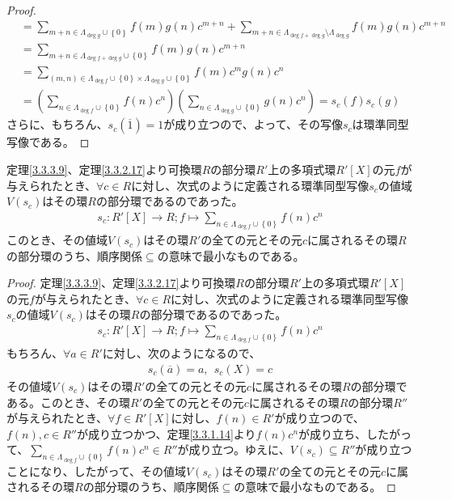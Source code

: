 \documentclass[dvipdfmx]{jsarticle}
\begin{document}
\begin{proof}
\begin{align*}
&= \sum_{m + n \in \varLambda_{\deg g} \cup \left\{ 0 \right\}} {f(m)g(n)c^{m + n}} + \sum_{m + n \in \varLambda_{\deg f + \deg g} \setminus \varLambda_{\deg g}} {f(m)g(n)c^{m + n}}\\
&= \sum_{m + n \in \varLambda_{\deg f + \deg g} \cup \left\{ 0 \right\}} {f(m)g(n)c^{m + n}}\\
&= \sum_{(m,n) \in \varLambda_{\deg f} \cup \left\{ 0 \right\} \times \varLambda_{\deg g} \cup \left\{ 0 \right\}} {f(m)c^{m}g(n)c^{n}}\\
&= \left( \sum_{n \in \varLambda_{\deg f} \cup \left\{ 0 \right\}} {f(n)c^{n}} \right)\left( \sum_{n \in \varLambda_{\deg g} \cup \left\{ 0 \right\}} {g(n)c^{n}} \right) = s_{c}(f)s_{c}(g)
\end{align*}
さらに、もちろん、$s_{c}\left( \overline{1} \right) = 1$が成り立つので、よって、その写像$s_{c}$は環準同型写像である。
\end{proof}
\begin{thm}\label{3.3.3.10}
定理\ref{3.3.3.9}、定理\ref{3.3.2.17}より可換環$R$の部分環$R'$上の多項式環$R'[ X]$の元$f$が与えられたとき、$\forall c \in R$に対し、次式のように定義される環準同型写像$s_{c}$の値域$V\left( s_{c} \right)$はその環$R$の部分環であるのであった。
\begin{align*}
s_{c}:R'[ X] \rightarrow R;f \mapsto \sum_{n \in \varLambda_{\deg f} \cup \left\{ 0 \right\}} {f(n)c^{n}}
\end{align*}
このとき、その値域$V\left( s_{c} \right)$はその環$R'$の全ての元とその元$c$に属されるその環$R$の部分環のうち、順序関係$\subseteq$の意味で最小なものである。
\end{thm}
\begin{proof} 
定理\ref{3.3.3.9}、定理\ref{3.3.2.17}より可換環$R$の部分環$R'$上の多項式環$R'[ X]$の元$f$が与えられたとき、$\forall c \in R$に対し、次式のように定義される環準同型写像$s_{c}$の値域$V\left( s_{c} \right)$はその環$R$の部分環であるのであった。
\begin{align*}
s_{c}:R'[ X] \rightarrow R;f \mapsto \sum_{n \in \varLambda_{\deg f} \cup \left\{ 0 \right\}} {f(n)c^{n}}
\end{align*}
もちろん、$\forall a \in R'$に対し、次のようになるので、
\begin{align*}
s_{c}\left( \overline{a} \right) = a,\ \ s_{c}(X) = c
\end{align*}
その値域$V\left( s_{c} \right)$はその環$R'$の全ての元とその元$c$に属されるその環$R$の部分環である。このとき、その環$R'$の全ての元とその元$c$に属されるその環$R$の部分環$R''$が与えられたとき、$\forall f \in R'[ X]$に対し、$f(n) \in R'$が成り立つので、$f(n),c \in R''$が成り立つかつ、定理\ref{3.3.1.14}より$f(n)c^{n}$が成り立ち、したがって、$\sum_{n \in \varLambda_{\deg f} \cup \left\{ 0 \right\}} {f(n)c^{n}} \in R''$が成り立つ。ゆえに、$V\left( s_{c} \right) \subseteq R''$が成り立つことになり、したがって、その値域$V\left( s_{c} \right)$はその環$R'$の全ての元とその元$c$に属されるその環$R$の部分環のうち、順序関係$\subseteq$の意味で最小なものである。
\end{proof}
\end{document}

